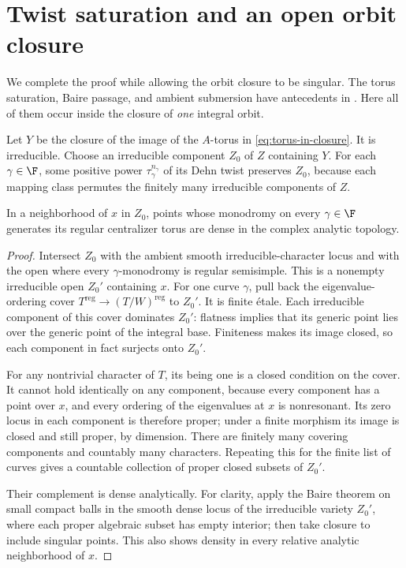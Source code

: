 \section{Twist saturation and an open orbit closure}\label{sec:closure}
We complete the proof while allowing the orbit closure to be singular.
The torus saturation, Baire passage, and ambient submersion have
antecedents in \cite[Section on closed-surface dynamics]{Source027}.
Here all of them occur inside the closure of \emph{one} integral orbit.

Let $Y$ be the closure of the image of the $A$-torus in
\eqref{eq:torus-in-closure}. It is irreducible. Choose an irreducible
component $Z_0$ of $Z$ containing $Y$. For each $\gamma\in\F$, some
positive power $\tau_\gamma^{n_\gamma}$ of its Dehn twist preserves
$Z_0$, because each mapping class permutes the finitely many irreducible
components of $Z$.

\begin{lemma}\label{lem:component-nonres}
In a neighborhood of $x$ in $Z_0$, points whose monodromy on every
$\gamma\in\F$ generates its regular centralizer torus are dense in the
complex analytic topology.
\end{lemma}
\begin{proof}
Intersect $Z_0$ with the ambient smooth irreducible-character locus and
with the open where every $\gamma$-monodromy is regular semisimple.
This is a nonempty irreducible open $Z_0'$ containing $x$.
For one curve $\gamma$, pull back the eigenvalue-ordering cover
$T^{\mathrm{reg}}\to(T/W)^{\mathrm{reg}}$ to $Z_0'$. It is finite
\'etale. Each irreducible component of this cover dominates $Z_0'$:
flatness implies that its generic point lies over the generic point of
the integral base. Finiteness makes its image closed, so each component
in fact surjects onto $Z_0'$.

For any nontrivial character of $T$, its being one is a closed condition
on the cover. It cannot hold identically on any component, because every
component has a point over $x$, and every ordering of the eigenvalues at
$x$ is nonresonant. Its zero locus in each component is therefore proper;
under a finite morphism its image is closed and still proper, by dimension.
There are finitely many covering components and countably many characters.
Repeating this for the finite list of curves gives a countable collection
of proper closed subsets of $Z_0'$.

Their complement is dense analytically. For clarity, apply the Baire
theorem on small compact balls in the smooth dense locus of the
irreducible variety $Z_0'$, where each proper algebraic subset has empty
interior; then take closure to include singular points. This also shows
density in every relative analytic neighborhood of $x$.
\end{proof}


